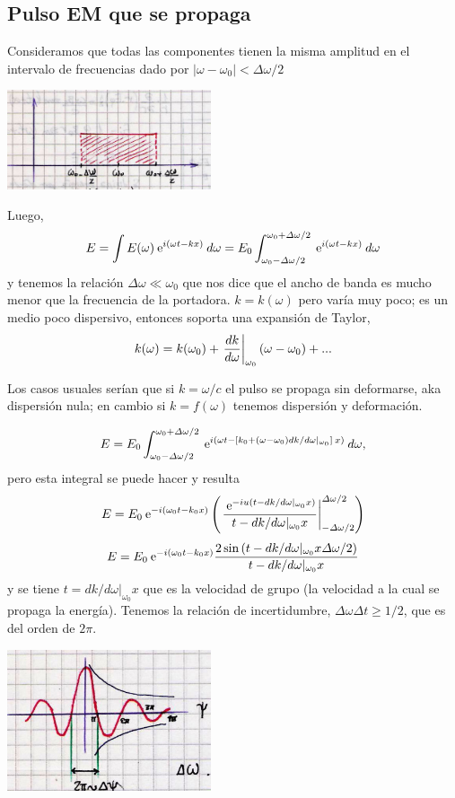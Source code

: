 \documentclass[10pt,oneside]{CBFT_book}
\begin{document}
\subsection{Pulso EM que se propaga}

Consideramos que todas las componentes tienen la misma amplitud en el intervalo
de frecuencias dado por $|\omega - \omega_0|<\Delta\omega/2$

\includegraphics[width=0.45\textwidth]{images/fig_ft1_pulso_em1.jpg}

Luego,
\[
	E = \int E(\omega) \:\mathrm{e}^{i(\omega t - kx )} \: d\omega =
	E_0 \int_{\omega_0-\Delta\omega/2}^{\omega_0+\Delta\omega/2} 
	\:\mathrm{e}^{i(\omega t - kx )} \: d\omega
\]
y tenemos la relación $\Delta \omega \ll \omega_0 $ que nos dice que el ancho de banda
es mucho menor que la frecuencia de la portadora.
$k=k(\omega)$ pero varía muy poco; es un medio poco dispersivo, entonces soporta una 
expansión de Taylor,
\[
	k(\omega) = k(\omega_0) + \left. \frac{d^{\hspace{-0.05em}} {k}}{d {\omega}^{\hspace{-0.05em}}}\right|_{\omega_0}(\omega -\omega_0) +
	...
\]

Los casos usuales serían que si $k=\omega/c$ el pulso se propaga sin deformarse, aka 
dispersión nula; en cambio si $k=f(\omega)$ tenemos dispersión y deformación.

\[
	E = E_0 \int_{\omega_0-\Delta\omega/2}^{\omega_0+\Delta\omega/2} 
	\:\mathrm{e}^{i(\omega t - [k_0 + (\omega-\omega_0)dk/d\omega|_{\omega_0} ] \: x )} \: d\omega,
\]
pero esta integral se puede hacer y resulta
\[
	E = E_0 \:\mathrm{e}^{-i(\omega_0 t - k_0x )} 
	\left( 
	\left. \frac{ \:\mathrm{e}^{-i u ( t - dk/d\omega|_{\omega_0} x ) } }{ t - dk/d\omega|_{\omega_0} x} 
	\right|_{-\Delta\omega/2}^{\Delta\omega/2}
	\right)
\]
\[
	E = E_0 \:\mathrm{e}^{-i(\omega_0 t - k_0x )} 
	\frac{ 2 \sin\left( t - dk/d\omega|_{\omega_0} x \Delta\omega/2 \right) }
	{ t - dk/d\omega|_{\omega_0} x } 
\]
y se tiene $t = dk/d\omega|_{\omega_0} x$ que es la velocidad de grupo (la velocidad a la cual
se propaga la energía).
Tenemos la relación de incertidumbre, $\Delta \omega \Delta t \geq 1/2$, que es del orden de
$2\pi$.


\includegraphics[width=0.45\textwidth]{images/fig_ft1_pulso_em2.jpg}
\end{document}
